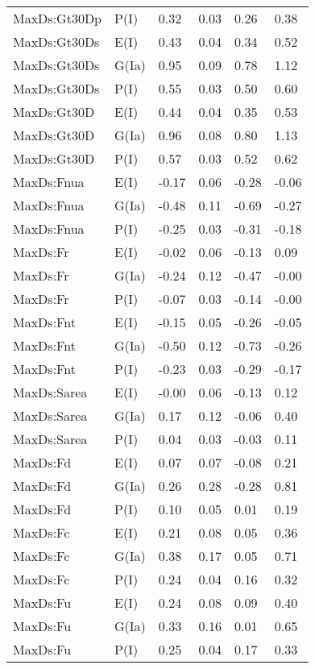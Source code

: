 \begin{center}
\begin{longtable}{|p{1.1in}|p{0.7in}|p{0.7in}|p{0.6in}|p{0.6in}|p{0.6in}|}
  MaxDs:Gt30Dp & P(I) & 0.32 & 0.03 & 0.26 & 0.38 \\ 
  MaxDs:Gt30Ds & E(I) & 0.43 & 0.04 & 0.34 & 0.52 \\ 
  MaxDs:Gt30Ds & G(Ia) & 0.95 & 0.09 & 0.78 & 1.12 \\ 
  MaxDs:Gt30Ds & P(I) & 0.55 & 0.03 & 0.50 & 0.60 \\ 
  MaxDs:Gt30D & E(I) & 0.44 & 0.04 & 0.35 & 0.53 \\ 
  MaxDs:Gt30D & G(Ia) & 0.96 & 0.08 & 0.80 & 1.13 \\ 
  MaxDs:Gt30D & P(I) & 0.57 & 0.03 & 0.52 & 0.62 \\ 
  MaxDs:Fnua & E(I) & -0.17 & 0.06 & -0.28 & -0.06 \\ 
  MaxDs:Fnua & G(Ia) & -0.48 & 0.11 & -0.69 & -0.27 \\ 
  MaxDs:Fnua & P(I) & -0.25 & 0.03 & -0.31 & -0.18 \\ 
  MaxDs:Fr & E(I) & -0.02 & 0.06 & -0.13 & 0.09 \\ 
  MaxDs:Fr & G(Ia) & -0.24 & 0.12 & -0.47 & -0.00 \\ 
  MaxDs:Fr & P(I) & -0.07 & 0.03 & -0.14 & -0.00 \\ 
  MaxDs:Fnt & E(I) & -0.15 & 0.05 & -0.26 & -0.05 \\ 
  MaxDs:Fnt & G(Ia) & -0.50 & 0.12 & -0.73 & -0.26 \\ 
  MaxDs:Fnt & P(I) & -0.23 & 0.03 & -0.29 & -0.17 \\ 
  MaxDs:Sarea & E(I) & -0.00 & 0.06 & -0.13 & 0.12 \\ 
  MaxDs:Sarea & G(Ia) & 0.17 & 0.12 & -0.06 & 0.40 \\ 
  MaxDs:Sarea & P(I) & 0.04 & 0.03 & -0.03 & 0.11 \\ 
  MaxDs:Fd & E(I) & 0.07 & 0.07 & -0.08 & 0.21 \\ 
  MaxDs:Fd & G(Ia) & 0.26 & 0.28 & -0.28 & 0.81 \\ 
  MaxDs:Fd & P(I) & 0.10 & 0.05 & 0.01 & 0.19 \\ 
  MaxDs:Fc & E(I) & 0.21 & 0.08 & 0.05 & 0.36 \\ 
  MaxDs:Fc & G(Ia) & 0.38 & 0.17 & 0.05 & 0.71 \\ 
  MaxDs:Fc & P(I) & 0.24 & 0.04 & 0.16 & 0.32 \\ 
  MaxDs:Fu & E(I) & 0.24 & 0.08 & 0.09 & 0.40 \\ 
  MaxDs:Fu & G(Ia) & 0.33 & 0.16 & 0.01 & 0.65 \\ 
  MaxDs:Fu & P(I) & 0.25 & 0.04 & 0.17 & 0.33 \\ 

\end{longtable}
\end{center}
